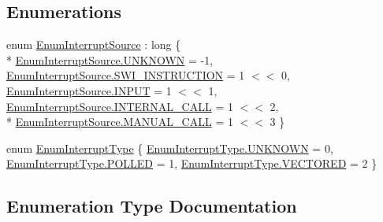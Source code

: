 \subsection*{Enumerations}
\begin{DoxyCompactItemize}
\item 
enum \hyperlink{namespace_c_p_u___o_s___simulator_1_1_c_p_u_1_1_interrupts_a97a0f4951d9cfd2f99d166b8fa840c02}{Enum\+Interrupt\+Source} \+: long \{ \\*
\hyperlink{namespace_c_p_u___o_s___simulator_1_1_c_p_u_1_1_interrupts_a97a0f4951d9cfd2f99d166b8fa840c02a696b031073e74bf2cb98e5ef201d4aa3}{Enum\+Interrupt\+Source.\+U\+N\+K\+N\+O\+W\+N} = -\/1, 
\hyperlink{namespace_c_p_u___o_s___simulator_1_1_c_p_u_1_1_interrupts_a97a0f4951d9cfd2f99d166b8fa840c02af35873b36fc1e059d59cd936284038e0}{Enum\+Interrupt\+Source.\+S\+W\+I\+\_\+\+I\+N\+S\+T\+R\+U\+C\+T\+I\+O\+N} = 1 $<$$<$ 0, 
\hyperlink{namespace_c_p_u___o_s___simulator_1_1_c_p_u_1_1_interrupts_a97a0f4951d9cfd2f99d166b8fa840c02aa84cc046d48610b05c21fd3670d0c829}{Enum\+Interrupt\+Source.\+I\+N\+P\+U\+T} = 1 $<$$<$ 1, 
\hyperlink{namespace_c_p_u___o_s___simulator_1_1_c_p_u_1_1_interrupts_a97a0f4951d9cfd2f99d166b8fa840c02add6a9e10b31dee9ea17789094ceb2daf}{Enum\+Interrupt\+Source.\+I\+N\+T\+E\+R\+N\+A\+L\+\_\+\+C\+A\+L\+L} = 1 $<$$<$ 2, 
\\*
\hyperlink{namespace_c_p_u___o_s___simulator_1_1_c_p_u_1_1_interrupts_a97a0f4951d9cfd2f99d166b8fa840c02a9e40b16d89b9a7d60c8609cfac43540f}{Enum\+Interrupt\+Source.\+M\+A\+N\+U\+A\+L\+\_\+\+C\+A\+L\+L} = 1 $<$$<$ 3
 \}
\item 
enum \hyperlink{namespace_c_p_u___o_s___simulator_1_1_c_p_u_1_1_interrupts_a575a43213ed6d54083da8956c5a69b39}{Enum\+Interrupt\+Type} \{ \hyperlink{namespace_c_p_u___o_s___simulator_1_1_c_p_u_1_1_interrupts_a575a43213ed6d54083da8956c5a69b39a696b031073e74bf2cb98e5ef201d4aa3}{Enum\+Interrupt\+Type.\+U\+N\+K\+N\+O\+W\+N} = 0, 
\hyperlink{namespace_c_p_u___o_s___simulator_1_1_c_p_u_1_1_interrupts_a575a43213ed6d54083da8956c5a69b39a397c0d49b5c3c02178a32ff2516ed1df}{Enum\+Interrupt\+Type.\+P\+O\+L\+L\+E\+D} = 1, 
\hyperlink{namespace_c_p_u___o_s___simulator_1_1_c_p_u_1_1_interrupts_a575a43213ed6d54083da8956c5a69b39a59206d2e5d7114b7fe9511d169d2945e}{Enum\+Interrupt\+Type.\+V\+E\+C\+T\+O\+R\+E\+D} = 2
 \}
\end{DoxyCompactItemize}


\subsection{Enumeration Type Documentation}
\hypertarget{namespace_c_p_u___o_s___simulator_1_1_c_p_u_1_1_interrupts_a97a0f4951d9cfd2f99d166b8fa840c02}{}
